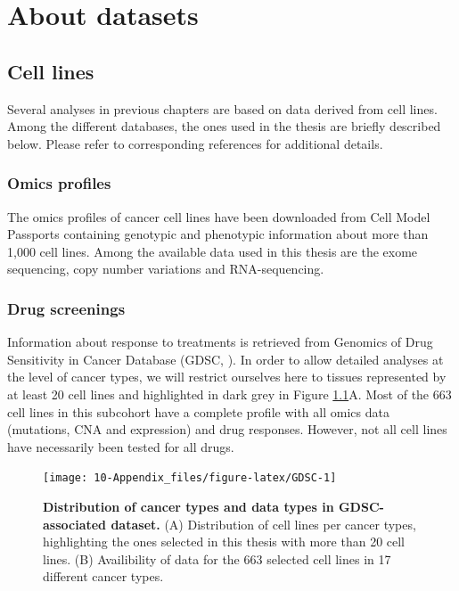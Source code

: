 \documentclass[a4paper,12pt,twoside,onecolumn,openright,final,oldfontcommands]{memoir}
\begin{document}
\chapter{About datasets}\label{appendix-datasets}

\section{Cell lines}\label{appendix-cl}

Several analyses in previous chapters are based on data derived from
cell lines. Among the different databases, the ones used in the thesis
are briefly described below. Please refer to corresponding references
for additional details.

\subsection{Omics profiles}\label{omics-profiles}

The omics profiles of cancer cell lines have been downloaded from Cell
Model Passports \citep{van2019cell} containing genotypic and phenotypic
information about more than 1,000 cell lines. Among the available data
used in this thesis are the exome sequencing, copy number variations and
RNA-sequencing.

\subsection{Drug screenings}\label{appendix-GDSC}

Information about response to treatments is retrieved from Genomics of
Drug Sensitivity in Cancer Database (GDSC, \citet{yang2012genomics}). In
order to allow detailed analyses at the level of cancer types, we will
restrict ourselves here to tissues represented by at least 20 cell lines
and highlighted in dark grey in Figure \ref{fig:GDSC}A. Most of the 663
cell lines in this subcohort have a complete profile with all omics data
(mutations, CNA and expression) and drug responses. However, not all
cell lines have necessarily been tested for all drugs.

\begin{figure}

{\centering \texttt{[image: 10-Appendix\_files/figure-latex/GDSC-1]} 

}

\caption[Distribution of cancer types and data types in GDSC-associated dataset]{\textbf{Distribution of cancer types and data types
in GDSC-associated dataset.} (A) Distribution of cell lines per cancer
types, highlighting the ones selected in this thesis with more than 20
cell lines. (B) Availibility of data for the 663 selected cell lines in
17 different cancer types.}\label{fig:GDSC}
\end{figure}
\end{document}
